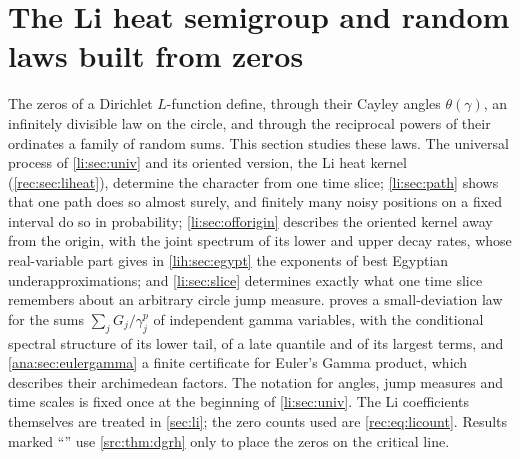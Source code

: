 \providecommand{\recsinc}{\operatorname{sinc}}
\providecommand{\recgE}{\gamma_{\mathrm{E}}}
\providecommand{\recGen}{\operatorname{Gen}}
\providecommand{\recav}{\operatorname{av}}
\providecommand{\recA}{\mathcal{A}}
\providecommand{\recartanh}{\operatorname{artanh}}
\providecommand{\anapos}[1]{\bigl(#1\bigr)_{+}}
\providecommand{\ananeg}[1]{\bigl(#1\bigr)_{-}}
\providecommand{\anaone}{\mathbf{1}}
\providecommand{\anaE}{\mathcal{E}}
\providecommand{\anaEx}{\mathbb{E}}
\providecommand{\anaPr}{\mathbb{P}}
\providecommand{\anaM}{\mathcal{M}}
\providecommand{\anaW}{\mathcal{W}}
\providecommand{\anaZ}{\mathcal{Z}}
\providecommand{\anaC}{\mathcal{C}}
\providecommand{\liE}{\mathcal{E}}
\providecommand{\liD}{\mathcal{D}}
\providecommand{\liZ}{\mathcal{Z}}
\providecommand{\liT}{\mathbb{T}}
\providecommand{\lidist}[1]{\lVert #1\rVert_{\mathbb{T}}}
\providecommand{\liEx}{\mathbb{E}}
\providecommand{\liind}{\mathbf{1}}
\providecommand{\liHk}{\mathcal{H}}
\providecommand{\liKk}{\mathcal{K}}
\section{The Li heat semigroup and random laws built from zeros}\label{sec:lih}

The zeros of a Dirichlet $L$-function define, through their Cayley angles $\theta(\gamma)$, an
infinitely divisible law on the circle, and through the reciprocal powers of their ordinates a
family of random sums. This section studies these laws. The universal process of
\cref{li:sec:univ} and its oriented version, the Li heat kernel (\cref{rec:sec:liheat}),
determine the character from one time slice; \cref{li:sec:path} shows that one path does so
almost surely, and finitely many noisy positions on a fixed interval do so in probability;
\cref{li:sec:offorigin} describes the oriented kernel away from the origin, with the joint
spectrum of its lower and upper decay rates, whose real-variable part gives in
\cref{lih:sec:egypt} the exponents of best Egyptian underapproximations; and
\cref{li:sec:slice} determines exactly what one time slice remembers about an arbitrary circle
jump measure.  proves a small-deviation law for the sums
$\sum_jG_j/\gamma_j^p$ of independent gamma variables, with the conditional spectral structure of
its lower tail, of a late quantile and of its largest terms, and \cref{ana:sec:eulergamma} a finite certificate for
Euler's Gamma product, which describes their archimedean factors. The notation for angles, jump
measures and time scales is fixed once at the beginning of \cref{li:sec:univ}. The Li
coefficients themselves are treated in \cref{sec:li}; the zero counts used are
\eqref{rec:eq:licount}. Results marked ``\stG'' use \cref{src:thm:dgrh} only to place the zeros
on the critical line.

